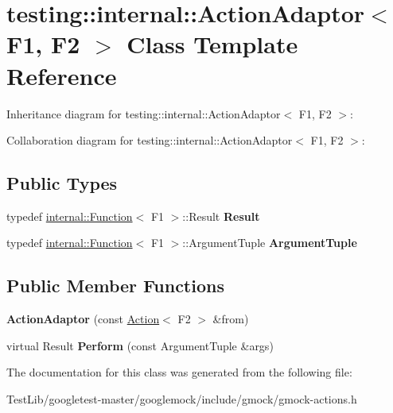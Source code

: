 \hypertarget{classtesting_1_1internal_1_1ActionAdaptor}{}\section{testing\+:\+:internal\+:\+:Action\+Adaptor$<$ F1, F2 $>$ Class Template Reference}
\label{classtesting_1_1internal_1_1ActionAdaptor}


Inheritance diagram for testing\+:\+:internal\+:\+:Action\+Adaptor$<$ F1, F2 $>$\+:


Collaboration diagram for testing\+:\+:internal\+:\+:Action\+Adaptor$<$ F1, F2 $>$\+:
\subsection*{Public Types}
\begin{DoxyCompactItemize}
\item 
\mbox{\label{classtesting_1_1internal_1_1ActionAdaptor_afa8f7872b6db3d8f1545fd98b45b0b95}} 
typedef \hyperlink{structtesting_1_1internal_1_1Function}{internal\+::\+Function}$<$ F1 $>$\+::Result {\bfseries Result}
\item 
\mbox{\label{classtesting_1_1internal_1_1ActionAdaptor_a4f78fb73f97b72fea8a93b78a8ab5704}} 
typedef \hyperlink{structtesting_1_1internal_1_1Function}{internal\+::\+Function}$<$ F1 $>$\+::Argument\+Tuple {\bfseries Argument\+Tuple}
\end{DoxyCompactItemize}
\subsection*{Public Member Functions}
\begin{DoxyCompactItemize}
\item 
\mbox{\label{classtesting_1_1internal_1_1ActionAdaptor_a24ba3330ef3cc365b956c50ec73e4177}} 
{\bfseries Action\+Adaptor} (const \hyperlink{classtesting_1_1Action}{Action}$<$ F2 $>$ \&from)
\item 
\mbox{\label{classtesting_1_1internal_1_1ActionAdaptor_a8d8a47a31f068cf6e0c95b91605d5540}} 
virtual Result {\bfseries Perform} (const Argument\+Tuple \&args)
\end{DoxyCompactItemize}


The documentation for this class was generated from the following file\+:\begin{DoxyCompactItemize}
\item 
Test\+Lib/googletest-\/master/googlemock/include/gmock/gmock-\/actions.\+h\end{DoxyCompactItemize}
